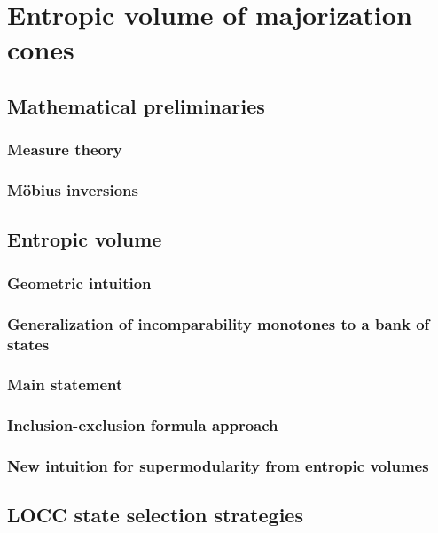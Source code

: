 \chapter{Entropic volume of majorization cones}

\section{Mathematical preliminaries}

\subsection{Measure theory}

\subsection{Möbius inversions}

\section{Entropic volume}

\subsection{Geometric intuition}

\subsection{Generalization of incomparability monotones to a bank of states}

\subsection{Main statement}

\subsection{Inclusion-exclusion formula approach}

\subsection{New intuition for supermodularity from entropic volumes}

\section{LOCC state selection strategies} \label{sec:strategies}

